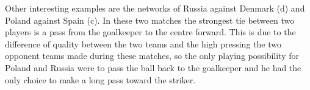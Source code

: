 \documentclass[12pt, a4paper]{article}
\begin{document}
\begin{figure}[H]
        \centering
        \qquad
        \label{fig: spain_pattern}%
\end{figure}

Other interesting examples are the networks of Russia against Denmark (d) and Poland against Spain (c). In these two matches the strongest tie between two players is a pass from the goalkeeper to the centre forward. This is due to the difference of quality between the two teams and the high pressing the two opponent teams made during these matches, so the only playing possibility for Poland and Russia were to pass the ball back to the goalkeeper and he had the only choice to make a long pass toward the striker. \\


\begin{figure}[H]
        \centering
        \qquad
        \label{fig:example}%
\end{figure}
\end{document}
